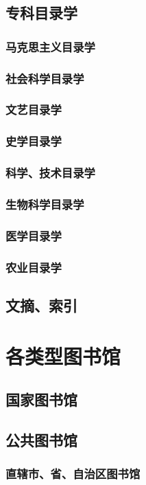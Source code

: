 \documentclass[UTF8]{../../ApplicationUniverse}
\begin{document}
\subsection{专科目录学}
    \subsubsection{马克思主义目录学}
    \subsubsection{社会科学目录学}
    \subsubsection{文艺目录学}
    \subsubsection{史学目录学}
    \subsubsection{科学、技术目录学}
    \subsubsection{生物科学目录学}
    \subsubsection{医学目录学}
    \subsubsection{农业目录学}
\subsection{文摘、索引}


\section{各类型图书馆}
\subsection{国家图书馆}
\subsection{公共图书馆}
    \subsubsection{直辖市、省、自治区图书馆}
\end{document}
